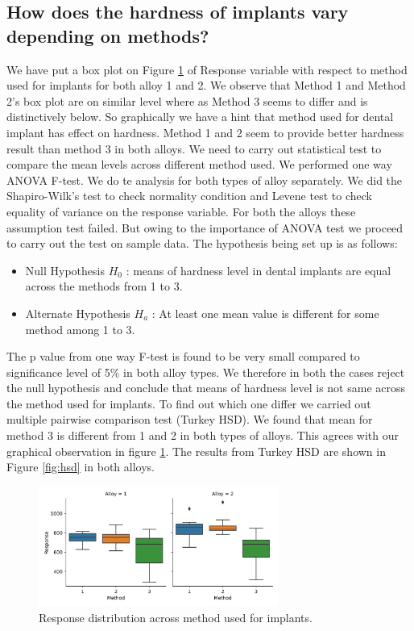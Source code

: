 \documentclass[12pt,a4paper]{style}
\begin{document}
	\subsection{How does the hardness of implants vary depending on methods?}
	We have put a box plot on Figure \ref{fig:4.2} of Response variable with respect to method used for implants for both alloy 1 and 2. We observe that Method 1 and Method 2's box plot are on similar level where as Method 3 seems to differ and is distinctively below. So graphically we have a hint that method used for dental implant has effect on hardness. Method 1 and 2 seem to provide better hardness result than method 3 in both alloys. We need to carry out statistical test to compare the mean levels across different method used. We performed one way ANOVA F-test. We do te analysis for both types of alloy separately. We did the Shapiro-Wilk's test to check normality condition and Levene test to check equality of variance on the response variable. For both the alloys these assumption test failed. But owing to the importance of ANOVA test we proceed to carry out the test on sample data. The hypothesis being set up is as follows:      
		\begin{itemize}
		\item Null Hypothesis $H_0$ : means of hardness level in dental implants are equal across the methods from 1 to 3.
		\item Alternate Hypothesis $H_a$ : At least one mean value is different for some method among 1 to 3.
	\end{itemize}
	The p value from one way F-test is found to be very small compared to significance level of 5\% in both alloy types. We therefore in both the cases reject the null hypothesis and conclude that means of hardness level is not same across the method used for implants. To find out which one differ we carried out multiple pairwise comparison test (Turkey HSD). We found that mean for method 3 is different from 1 and 2 in both types of alloys. This agrees with our graphical observation in figure \ref{fig:4.2}. The results from Turkey HSD are shown in Figure \ref{fig:hsd} in both alloys.
	\begin{figure}
	\centering
	\includegraphics[width=0.7\textwidth]{4_2.png}
	\caption{Response distribution across method used for implants.}
	\label{fig:4.2}
	\end{figure}	
\end{document}

